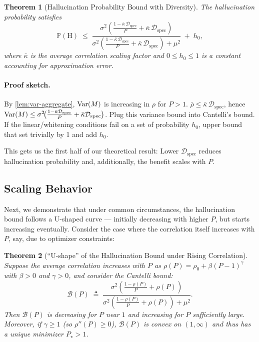 \documentclass{article} %
\newtheorem{theorem}{Theorem}
\newcommand{\Prob}{\mathbb{P}}
\newcommand{\HALL}{\mathrm{H}} %
\begin{document}
\begin{theorem}[Hallucination Probability Bound with Diversity]
  \label{thm:halluc-with-diversity}
  The hallucination probability satisfies
  \begin{equation}
    \Prob(\HALL)
    \;\le\;
    \frac{\sigma^2\left(\tfrac{1 - \bar{\kappa}\,\mathcal{D}_{\mathrm{spec}}}{P}
    + \bar{\kappa}\,\mathcal{D}_{\mathrm{spec}}\right)}
    {\sigma^2\left(\tfrac{1 - \bar{\kappa}\,\mathcal{D}_{\mathrm{spec}}}{P}
    + \bar{\kappa}\,\mathcal{D}_{\mathrm{spec}}\right) + \mu^2}
    \;+\; h_0,
  \end{equation}
  where $\bar{\kappa}$ is the average correlation scaling factor and $0\le h_0\le 1$ is a constant accounting
  for approximation error.
\end{theorem}

\paragraph{Proof sketch.}
By \autoref{lem:var-aggregate}, $\mathrm{Var}(M)$ is increasing in $\rho$ for $P>1$. $\bar\rho \le
\bar\kappa\,\mathcal{D}_{\mathrm{spec}}$, hence $\mathrm{Var}(M) \le
\sigma^2\!\big(\tfrac{1-\bar\kappa \mathcal{D}_{\mathrm{spec}}}{P}+\bar\kappa
\mathcal{D}_{\mathrm{spec}}\big)$. Plug this variance bound into Cantelli's bound. If the linear/whitening
conditions fail on a set of probability $h_0$, upper bound that set trivially by
1 and add $h_0$.

This gets us the first half of our theoretical result: Lower $\mathcal{D}_{\mathrm{spec}}$ reduces
hallucination probability and, additionally, the benefit scales with $P$.

\subsection{Scaling Behavior}
Next, we demonstrate that under common circumstances, the hallucination bound follows a U-shaped
curve --- initially decreasing with higher $P$, but starts increasing eventually. Consider the case where the
correlation itself increases with $P$, say, due to optimizer constraints:

\begin{theorem}[``U-shape'' of the Hallucination Bound under Rising Correlation]
  \label{thm:u-shape}
  Suppose the average correlation increases with $P$ as
  $\rho(P)=\rho_0+\beta(P-1)^\gamma$ with $\beta>0$ and $\gamma>0$,
  and consider the Cantelli bound:
  \begin{equation}
    \mathcal{B}(P)
    \;\triangleq\;
    \frac{\sigma^2\left(\tfrac{1-\rho(P)}{P}+\rho(P)\right)}
    {\sigma^2\left(\tfrac{1-\rho(P)}{P}+\rho(P)\right) + \mu^2}.
  \end{equation}
  Then $\mathcal{B}(P)$ is \emph{decreasing} for $P$ near $1$ and \emph{increasing} for $P$ sufficiently large.
  Moreover, if $\gamma\ge 1$ (so $\rho''(P)\ge 0$), $\mathcal{B}(P)$ is convex on $(1,\infty)$ and thus has a
  \emph{unique} minimizer $P_{\star}>1$.
\end{theorem}
\end{document}
